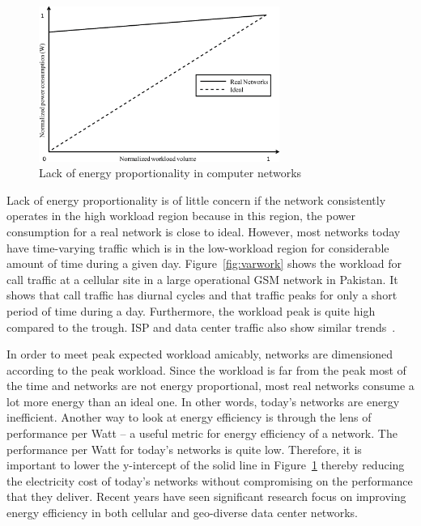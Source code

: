 \begin{figure}
\centering
\includegraphics[width=0.7\textwidth]{pics/enerprop.eps}
\caption{Lack of energy proportionality in computer networks}
\label{fig:ener-prop}
\end{figure} 

Lack of energy proportionality is of little concern if the network consistently operates in the high workload region because in this region, the power consumption for a real network is close to ideal. However, most networks today have time-varying traffic which is in the low-workload region for considerable amount of time during a given day. Figure~\ref{fig:varwork} shows the workload for call traffic at a cellular site in a large operational GSM network in Pakistan. It shows that call traffic has diurnal cycles and that traffic peaks for only a short period of time during a day. Furthermore, the workload peak is quite high compared to the trough. ISP and data center traffic also show similar trends~\cite{1248656,10.1109/MC.2007.443}. 

In order to meet peak expected workload amicably, networks are dimensioned according to the peak workload. Since the workload is far from the peak most of the time and networks are not energy proportional, most real networks consume a lot more energy than an ideal one. In other words, today's networks are energy inefficient. Another way to look at energy efficiency is through the lens of performance per Watt -- a useful metric for energy efficiency of a network. The performance per Watt for today's networks is quite low. Therefore, it is important to lower the y-intercept of the solid line in Figure~\ref{fig:ener-prop} thereby reducing the electricity cost of today's networks without compromising on the performance that they deliver. Recent years have seen significant research focus on improving energy efficiency in both cellular and geo-diverse data center networks.

